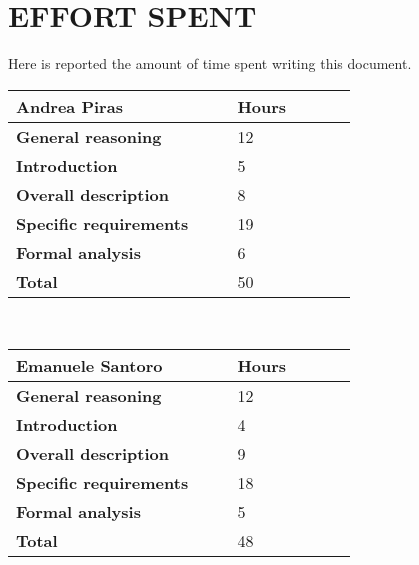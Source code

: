 \chapter{EFFORT SPENT}
\label{ch:effortSpent}%
Here is reported the amount of time spent writing this document.
\\[10pt]
\begin{table}[H]
\centering 
    \begin{tabular}{| p{0.55\linewidth} | p{0.30\linewidth} |}
    \hline
    \rowcolor{bluepoli!40}
    \textbf{Andrea Piras} & \textbf{Hours}\T\B \\    
    \hline \hline
    \textbf{General reasoning} & 12 \T\B \\
    \hline 
    \textbf{Introduction} & 5 \T\B \\
    \hline 
    \textbf{Overall description} & 8 \T\B \\
    \hline 
    \textbf{Specific requirements} & 19 \T\B \\
    \hline 
    \textbf{Formal analysis} & 6 \T\B \\
    \hline
    \textbf{Total} & 50 \T\B \\
    \hline
    \end{tabular}
    \\[10pt]
\end{table}
\begin{table}[H]
\centering 
    \begin{tabular}{| p{0.55\linewidth} | p{0.30\linewidth} |}
    \hline
    \rowcolor{bluepoli!40}
    \textbf{Emanuele Santoro} & \textbf{Hours}\T\B \\    
    \hline \hline
    \textbf{General reasoning} & 12 \T\B \\
    \hline 
    \textbf{Introduction} & 4 \T\B \\
    \hline 
    \textbf{Overall description} & 9 \T\B \\
    \hline 
    \textbf{Specific requirements} & 18 \T\B \\
    \hline 
    \textbf{Formal analysis} & 5 \T\B \\
    \hline
    \textbf{Total} & 48 \T\B \\
    \hline
    \end{tabular}
    \\[10pt]
\end{table}
